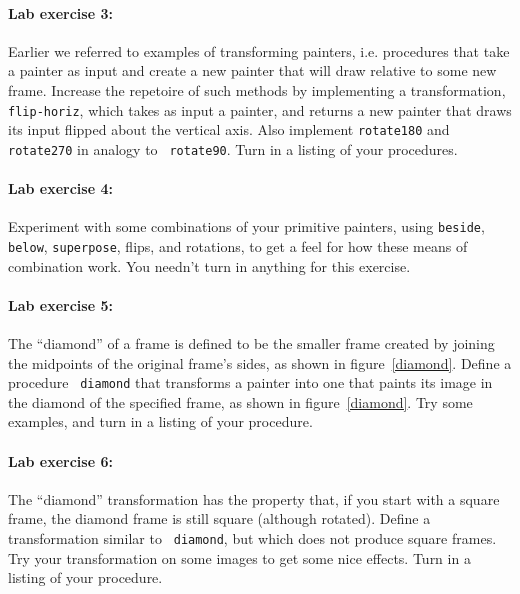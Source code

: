 \paragraph{Lab exercise 3:}
Earlier we referred to examples of transforming painters, i.e.
procedures that take a painter as input and create a new painter that
will draw relative to some new frame.  Increase
the repetoire of such methods by implementing a transformation,
{\tt flip-horiz}, which takes as input a painter, and returns a new
painter that draws its input flipped about the vertical axis.
Also implement {\tt rotate180} and {\tt rotate270} in analogy to {\tt
rotate90}.  Turn in a listing of your procedures.

\paragraph{Lab exercise 4:}
Experiment with some combinations of your primitive painters, using
{\tt beside}, {\tt below}, {\tt superpose}, flips, and rotations, to get a
feel for how these means of combination work.  You needn't turn in
anything for this exercise.

\paragraph{Lab exercise 5:}
The ``diamond'' of a frame is defined to be the smaller frame
created by joining the midpoints of the original frame's sides, as shown in
figure~\ref{diamond}.  Define a procedure {\tt
diamond} that transforms a painter into one that paints its image in
the diamond of the specified frame, as shown in
figure~\ref{diamond}.  Try some examples, and turn in a listing of
your procedure.




\paragraph{Lab exercise 6:}

The ``diamond'' transformation has the property that, if you start
with a square frame, the diamond frame is still square
(although rotated).  Define a transformation similar to {\tt
diamond}, but which does not produce square frames.  Try your
transformation on some images to get some nice effects.  Turn in a
listing of your procedure.

